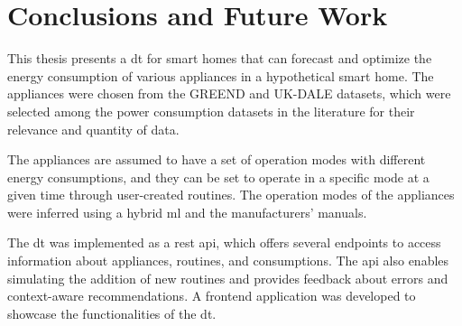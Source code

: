 \chapter{Conclusions and Future Work}\label{ch:conclusions}

This thesis presents a \acrshort{dt} for smart homes that can forecast and optimize the energy consumption of various appliances in a hypothetical smart home. The appliances were chosen from the GREEND and UK-DALE datasets, which were selected among the power consumption datasets in the literature for their relevance and quantity of data.

The appliances are assumed to have a set of operation modes with different energy consumptions, and they can be set to operate in a specific mode at a given time through user-created routines. The operation modes of the appliances were inferred using a hybrid \acrshort{ml} and the manufacturers' manuals. 

The \acrshort{dt} was implemented as a \acrshort{rest} \acrshort{api}, which offers several endpoints to access information about appliances, routines, and consumptions. The \acrshort{api} also enables simulating the addition of new routines and provides feedback about errors and context-aware recommendations. A frontend application was developed to showcase the functionalities of the \acrshort{dt}.

